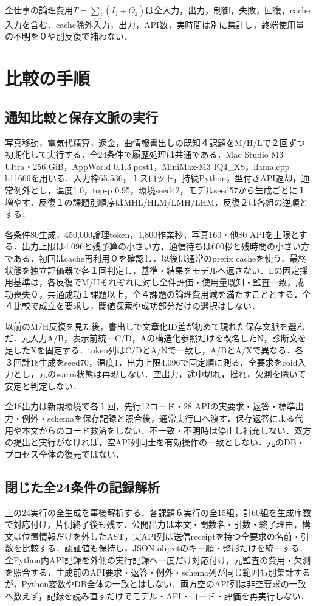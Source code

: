 \documentclass[uplatex,a4paper,twocolumn,10pt]{jsarticle}
\begin{document}
全仕事の論理費用$T=\sum_j(I_j+O_j)$は全入力，出力，制御，失敗，回復，cache入力を含む．cache除外入力，出力，API数，実時間は別に集計し，終端使用量の不明を０や別反復で補わない．

\section{比較の手順}
\subsection{通知比較と保存文脈の実行}
写真移動，電気代精算，返金，曲情報書出しの既知４課題をM/H/Lで２回ずつ初期化して実行する．全24条件で履歴処理は共通である．Mac Studio M3 Ultra・256 GiB，AppWorld 0.1.3.post1，MiniMax-M3 IQ4\_XS，llama.cpp b11669を用いる．入力枠65,536，１スロット，持続Python，型付きAPI返却，通常例外とし，温度1.0，top-p 0.95，環境seed42，モデルseed57から生成ごとに１増やす．反復１の課題別順序はMHL/HLM/LMH/LHM，反復２は各組の逆順とする．

各条件80生成，450,000論理token，1,800作業秒，写真160・他80 APIを上限とする．出力上限は4,096と残予算の小さい方，通信待ちは600秒と残時間の小さい方である．初回はcache再利用０を確認し，以後は通常のprefix cacheを使う．最終状態を独立評価器で各１回判定し，基準・結果をモデルへ返さない．Lの固定採用基準は，各反復でM/Hそれぞれに対し全件評価・使用量既知・監査一致，成功喪失０，共通成功１課題以上，全４課題の論理費用減を満たすこととする．全４比較で成立を要求し，閾値探索や成功部分だけの選択はしない．

以前のM/H反復を見た後，書出しで文章化ID差が初めて現れた保存文脈を選んだ．元入力A/B，表示前統一C/D，Aの構造化参照だけを改名したN，診断文を足したXを固定する．token列はC/DとA/Nで一致し，A/BとA/Xで異なる．各３回計18生成をseed70，温度1，出力上限4,096で固定順に測る．全要求をcold入力とし，元のwarm状態は再現しない．空出力，途中切れ，揺れ，欠測を除いて安定と判定しない．

全18出力は新規環境で各１回，先行12コード・28 APIの実要求・返答・標準出力・例外・schemaを保存記録と照合後，通常実行口へ渡す．保存返答による代用や本文からのコード救済をしない．不一致・不明時は停止し補充しない．双方の提出と実行がなければ，空API列同士を有効操作の一致としない．元のDB・プロセス全体の復元ではない．

\subsection{閉じた全24条件の記録解析}
上の24実行の全生成を事後解析する．各課題６実行の全15組，計60組を生成序数で対応付け，片側終了後も残す．公開出力は本文・関数名・引数・終了理由，構文は位置情報だけを外したAST，実API列は送信receiptを持つ全要求の名前・引数を比較する．認証値も保持し，JSON objectのキー順・整形だけを統一する．全Python内API記録を外側の実行記録へ一度だけ対応付け，元監査の費用・欠測を照合する．生成前のAPI要求・返答・例外・schema列が同じ範囲も別集計するが，Python変数やDB全体の一致とはしない．両方空のAPI列は非空要求の一致へ数えず，記録を読み直すだけでモデル・API・コード・評価を再実行しない．
\end{document}
